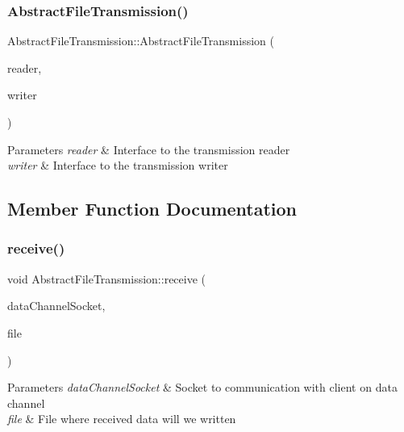 \subsubsection{\texorpdfstring{Abstract\+File\+Transmission()}{AbstractFileTransmission()}}
{\footnotesize\ttfamily Abstract\+File\+Transmission\+::\+Abstract\+File\+Transmission (\begin{DoxyParamCaption}\item[{const \hyperlink{classInterfaceTransmissionReader}{Interface\+Transmission\+Reader} \&}]{reader,  }\item[{const \hyperlink{classInterfaceTransmissionWriter}{Interface\+Transmission\+Writer} \&}]{writer }\end{DoxyParamCaption})}


\begin{DoxyParams}{Parameters}
{\em reader} & Interface to the transmission reader \\
\hline
{\em writer} & Interface to the transmission writer \\
\hline
\end{DoxyParams}


\subsection{Member Function Documentation}
\mbox{\label{classAbstractFileTransmission_a0eaf52c2d4a568833867b59c01d0259b}} 
\subsubsection{\texorpdfstring{receive()}{receive()}}
{\footnotesize\ttfamily void Abstract\+File\+Transmission\+::receive (\begin{DoxyParamCaption}\item[{int}]{data\+Channel\+Socket,  }\item[{const Q\+File \&}]{file }\end{DoxyParamCaption})}


\begin{DoxyParams}{Parameters}
{\em data\+Channel\+Socket} & Socket to communication with client on data channel \\
\hline
{\em file} & File where received data will we written \\
\hline
\end{DoxyParams}
\mbox{\label{classAbstractFileTransmission_ad49bd97cf93532458f0eb2808af75e28}} 
